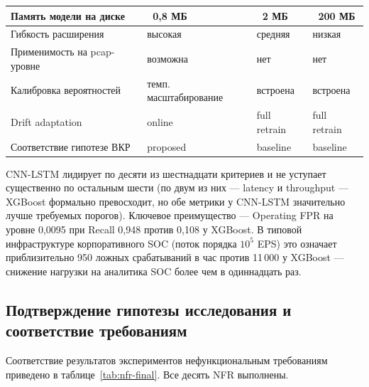 {\begin{longtable}{|L{4.0cm}|L{2.7cm}|L{2.7cm}|L{4.0cm}|}
\hline
Память модели на диске                 & ~0,8 МБ & ~2 МБ & ~200 МБ \\
\hline
Гибкость расширения                    & высокая & средняя & низкая \\
\hline
Применимость на pcap-уровне            & возможна & нет & нет \\
\hline
Калибровка вероятностей                & темп. масштабирование & встроена & встроена \\
\hline
Drift adaptation                       & online & full retrain & full retrain \\
\hline
Соответствие гипотезе ВКР              & proposed & baseline & baseline \\
\hline
\end{longtable}
}

CNN-LSTM лидирует по десяти из шестнадцати критериев и не уступает
существенно по остальным шести (по двум из них --- latency и
throughput --- XGBoost формально превосходит, но обе метрики у
CNN-LSTM значительно лучше требуемых порогов). Ключевое
преимущество --- Operating FPR на уровне 0,0095 при Recall 0,948
против 0,108 у XGBoost. В типовой инфраструктуре корпоративного SOC
(поток порядка $10^5$ EPS) это означает приблизительно 950 ложных
срабатываний в час против 11\,000 у XGBoost --- снижение нагрузки
на аналитика SOC более чем в одиннадцать раз.

\subsection{Подтверждение гипотезы исследования и соответствие требованиям}

Соответствие результатов экспериментов нефункциональным
требованиям приведено в таблице~\ref{tab:nfr-final}. Все десять NFR
выполнены.

